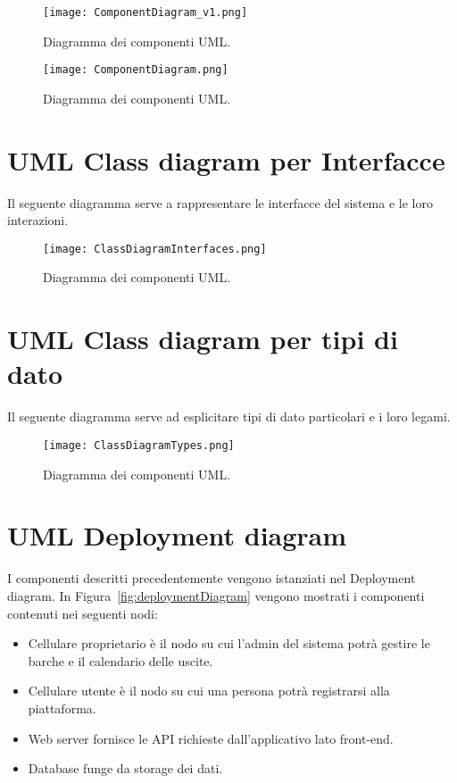 \begin{figure}[h]
    \centering
    \texttt{[image: ComponentDiagram\_v1.png]}
    \caption{Diagramma dei componenti UML.}\label{fig:componentDiagram}
\end{figure}
\begin{figure}[h]
    \centering
    \texttt{[image: ComponentDiagram.png]}
    \caption{Diagramma dei componenti UML.}\label{fig:componentDiagramLinda}
\end{figure}

\newpage

\section{UML Class diagram per Interfacce}
Il seguente diagramma serve a rappresentare le interfacce del sistema e le loro interazioni.
\begin{figure}
    \centering
    \texttt{[image: ClassDiagramInterfaces.png]}
    \caption{Diagramma dei componenti UML.}\label{fig:ClassDiagramInterfaces}
\end{figure}

\newpage

\section{UML Class diagram per tipi di dato}
Il seguente diagramma serve ad esplicitare tipi di dato particolari e i loro legami.
\begin{figure}[h]
    \centering
    \texttt{[image: ClassDiagramTypes.png]}
    \caption{Diagramma dei componenti UML.}\label{fig:ClassDiagramTypes}
\end{figure}

\section{UML Deployment diagram}
I componenti descritti precedentemente vengono istanziati nel Deployment diagram. In Figura~\ref{fig:deploymentDiagram} vengono mostrati i componenti contenuti nei seguenti nodi:

\begin{itemize}
    \item Cellulare proprietario è il nodo su cui l'admin del sistema potrà gestire le barche e il calendario delle uscite.
    \item Cellulare utente è il nodo su cui una persona potrà registrarsi alla piattaforma.
    \item Web server fornisce le API richieste dall'applicativo lato front-end.
    \item Database funge da storage dei dati.
\end{itemize}

